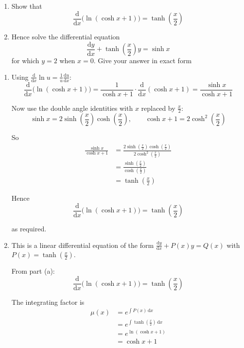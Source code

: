 \documentclass[leqno]{article}
\begin{document}
\begin{enumerate}[
  label=\textbf{\arabic*.},
  leftmargin=*,
  topsep=0pt,
  partopsep=0pt,
  parsep=0pt
]
\begin{enumerate}[label=\textbf{(\alph*)}]
  \item Show that
  \[
  \frac{\mathrm{d}}{\mathrm{d}x}\bigl(\ln(\cosh x+1)\bigr)=\tanh\!\left(\frac{x}{2}\right)
  \]
  \item Hence solve the differential equation
  \[
  \frac{\mathrm{d}y}{\mathrm{d}x}+\tanh\!\left(\frac{x}{2}\right)y=\sinh x
  \]
  for which $y=2$ when $x=0$. Give your answer in exact form  \\
\end{enumerate}

\vspace*{10pt}

\begin{djsSolution}
\begin{enumerate}[label=\textbf{(\alph*)}]
  \item Using \(\frac{\mathrm{d}}{\mathrm{d}x}\ln u=\frac{1}{u}\frac{\mathrm{d}u}{\mathrm{d}x}\):
\[
\frac{\mathrm{d}}{\mathrm{d}x}\bigl(\ln(\cosh x+1)\bigr)
=\frac{1}{\cosh x+1}\cdot \frac{\mathrm{d}}{\mathrm{d}x}(\cosh x+1)
=\frac{\sinh x}{\cosh x+1}
\]

Now use the double angle identities with \(x\) replaced by \(\frac{x}{2}\):
\[
\sinh x=2\sinh\left(\frac{x}{2}\right)\cosh\left(\frac{x}{2}\right),
\qquad
\cosh x+1=2\cosh^2\left(\frac{x}{2}\right)
\]

So
\begin{align*}
\frac{\sinh x}{\cosh x+1}
&=\frac{2\sinh\left(\frac{x}{2}\right)\cosh\left(\frac{x}{2}\right)}{2\cosh^2\left(\frac{x}{2}\right)} \\
&=\frac{\sinh\left(\frac{x}{2}\right)}{\cosh\left(\frac{x}{2}\right)} \\
&=\tanh\left(\frac{x}{2}\right)
\end{align*}

Hence
\[
\frac{\mathrm{d}}{\mathrm{d}x}\bigl(\ln(\cosh x+1)\bigr)=\tanh\left(\frac{x}{2}\right)
\]

as required.

  \item This is a linear differential equation of the form \(\frac{\mathrm{d}y}{\mathrm{d}x}+P(x)y=Q(x)\) with \(P(x)=\tanh\left(\frac{x}{2}\right)\).

From part (a):
\[
\frac{\mathrm{d}}{\mathrm{d}x}\bigl(\ln(\cosh x+1)\bigr)=\tanh\left(\frac{x}{2}\right)
\]

The integrating factor is
\begin{align*}
\mu(x)&=e^{\int P(x)\,\mathrm{d}x} \\
&=e^{\int \tanh\left(\frac{x}{2}\right)\,\mathrm{d}x} \\
&=e^{\ln(\cosh x+1)} \\
&=\cosh x+1
\end{align*}


\end{enumerate}
\end{djsSolution}
\end{enumerate}
\end{document}
